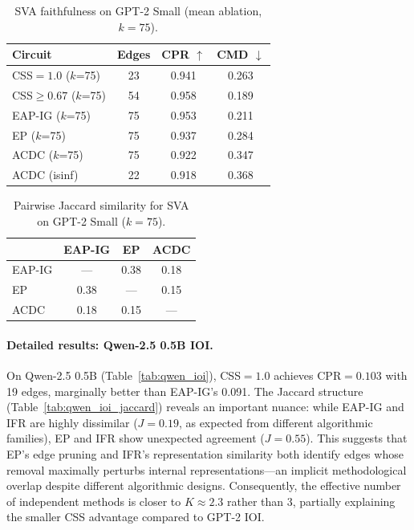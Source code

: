 \documentclass[11pt,a4paper]{article}
\newcommand{\css}{\textsc{CSS}}
\begin{document}
\begin{table}[t]
\centering
\small
\caption{SVA faithfulness on GPT-2 Small (mean ablation, $k\!=\!75$).}
\label{tab:sva_faith}
\begin{tabular}{@{}lccc@{}}
\toprule
Circuit & Edges & CPR $\uparrow$ & CMD $\downarrow$ \\
\midrule
\css{}$=1.0$ ($k$=75) & 23 & 0.941 & 0.263 \\
\css{}$\geq 0.67$ ($k$=75) & 54 & 0.958 & 0.189 \\
EAP-IG ($k$=75) & 75 & 0.953 & 0.211 \\
EP ($k$=75) & 75 & 0.937 & 0.284 \\
ACDC ($k$=75) & 75 & 0.922 & 0.347 \\
ACDC (isinf) & 22 & 0.918 & 0.368 \\
\bottomrule
\end{tabular}
\end{table}

\begin{table}[t]
\centering
\small
\caption{Pairwise Jaccard similarity for SVA on GPT-2 Small ($k\!=\!75$).}
\label{tab:sva_jaccard}
\begin{tabular}{@{}lccc@{}}
\toprule
 & EAP-IG & EP & ACDC \\
\midrule
EAP-IG & --- & 0.38 & 0.18 \\
EP & 0.38 & --- & 0.15 \\
ACDC & 0.18 & 0.15 & --- \\
\bottomrule
\end{tabular}
\end{table}

\paragraph{Detailed results: Qwen-2.5 0.5B IOI.}
On Qwen-2.5 0.5B (Table~\ref{tab:qwen_ioi}), \css{}$=1.0$ achieves CPR$=0.103$ with 19 edges, marginally better than EAP-IG's 0.091.
The Jaccard structure (Table~\ref{tab:qwen_ioi_jaccard}) reveals an important nuance: while EAP-IG and IFR are highly dissimilar ($J=0.19$, as expected from different algorithmic families), EP and IFR show unexpected agreement ($J=0.55$).
This suggests that EP's edge pruning and IFR's representation similarity both identify edges whose removal maximally perturbs internal representations---an implicit methodological overlap despite different algorithmic designs.
Consequently, the effective number of independent methods is closer to $K \approx 2.3$ rather than 3, partially explaining the smaller \css{} advantage compared to GPT-2 IOI.
\end{document}
